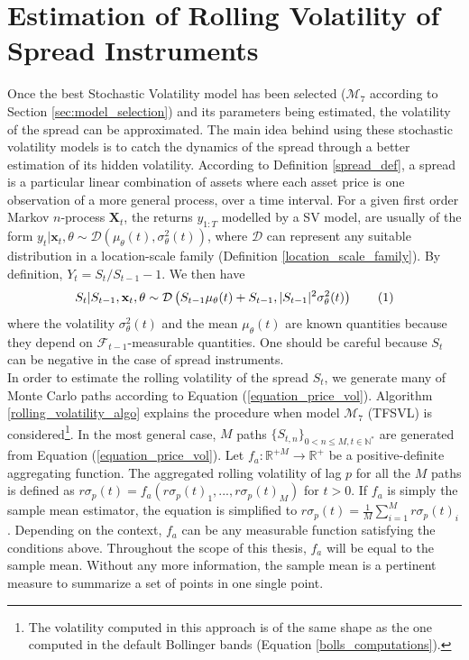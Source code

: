 \documentclass[11pt,a4,twosided,singlespacing,titlepagenumber=on]{scrreprt}
\numberwithin{equation}{chapter} %
\theoremstyle{remark}
\newcommand{\matr}[1]{\mathbf{#1}}
\newcommand\numberthis{\addtocounter{equation}{1}\tag{\theequation}}
\begin{document}
\section{Estimation of Rolling Volatility of Spread Instruments}
\label{sec:estimation_bollinger_bands_sv}
Once the best Stochastic Volatility model has been selected ($\mathcal{M}_7$ according to Section \ref{sec:model_selection}) and its parameters being estimated, the volatility of the spread can be approximated. The main idea behind using these stochastic volatility models is to catch the dynamics of the spread through a better estimation of its hidden volatility. According to Definition \ref{spread_def}, a spread is a particular linear combination of assets where each asset price is one observation of a more general process, over a time interval. For a given first order Markov $n$-process $\matr{X}_t$, the returns $y_{1:T}$ modelled by a SV model, are usually of the form $y_t | \matr{x}_t, \theta \sim \mathcal{D} \left( \mu_\theta(t), \sigma_\theta^2(t) \right)$, where $\mathcal{D}$ can represent any suitable distribution in a location-scale family (Definition \ref{location_scale_family}). By definition, $Y_t = S_t / S_{t-1} - 1$. We then have
\begin{equation}
S_t | S_{t-1}, \matr{x}_t, \theta \sim \mathcal{D} \left(S_{t-1} \mu_\theta(t)+S_{t-1}, |S_{t-1}|^2 \sigma_\theta^2(t) \right) \numberthis \label{equation_price_vol}
\end{equation}
where the volatility $\sigma_\theta^2(t)$ and the mean $\mu_\theta(t)$ are known quantities because they depend on $\mathcal{F}_{t-1}$-measurable quantities. One should be careful because $S_t$ can be negative in the case of spread instruments. \\

In order to estimate the rolling volatility of the spread $S_t$, we generate many of Monte Carlo paths according to Equation (\ref{equation_price_vol}). Algorithm \ref{rolling_volatility_algo} explains the procedure when model $\mathcal{M}_7$ (TFSVL) is considered\footnote{The volatility computed in this approach is of the same shape as the one computed in the default Bollinger bands (Equation \ref{bolls_computations}).}. In the most general case, $M$ paths $\{S_{t,n}\}_{0 < n \leq M, t \in \mathbb{N}^*}$ are generated from Equation (\ref{equation_price_vol}). Let $f_a : \mathbb{R}^{+M} \rightarrow \mathbb{R}^+$ be a positive-definite aggregating function. The aggregated rolling volatility of lag $p$ for all the $M$ paths is defined as $r\sigma_p(t) = f_a(r\sigma_p(t)_1,...,r\sigma_p(t)_M)$ for $t >0$. If $f_a$ is simply the sample mean estimator, the equation is simplified to $r\sigma_p(t) = \frac{1}{M}\sum_{i=1}^M r\sigma_p(t)_i$. Depending on the context, $f_a$ can be any measurable function satisfying the conditions above. Throughout the scope of this thesis, $f_a$ will be equal to the sample mean. Without any more information, the sample mean is a pertinent measure to summarize a set of points in one single point.
\end{document}
